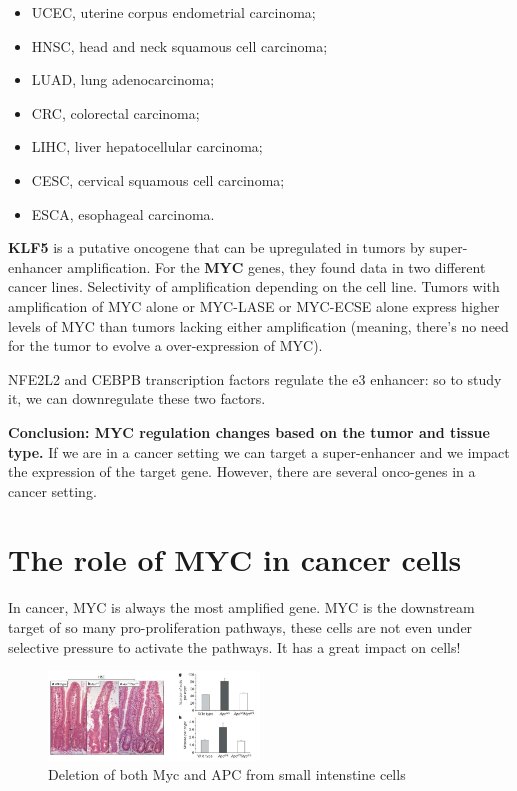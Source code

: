 \begin{itemize}
\item UCEC, uterine corpus endometrial carcinoma; 
\item HNSC, head and neck squamous cell carcinoma; 
\item LUAD, lung adenocarcinoma; 
\item CRC, colorectal carcinoma; 
\item LIHC, liver hepatocellular carcinoma; 
\item CESC, cervical squamous cell carcinoma; 
\item ESCA, esophageal carcinoma.
\end{itemize}

\textbf{KLF5} is a putative oncogene that can be upregulated in tumors by super-enhancer amplification.
For the \textbf{MYC} genes, they found data in two different cancer lines. Selectivity of amplification depending on the cell line.
Tumors with amplification of MYC alone or MYC-LASE or MYC-ECSE alone express higher levels of MYC than tumors lacking either amplification (meaning, there's no need for the tumor to evolve a over-expression of MYC).

NFE2L2 and CEBPB transcription factors regulate the e3 enhancer: so to study it, we can downregulate these two factors.

\textbf{Conclusion: MYC regulation changes based on the tumor and tissue type.}
If we are in a cancer setting we can target a super-enhancer and we impact the expression of the target gene. However, there are several onco-genes in a cancer setting.

\hypertarget{the-role-of-myc-in-cancer-cells}{%
\section{The role of MYC in cancer cells}\label{the-role-of-myc-in-cancer-cells}}

In cancer, MYC is always the most amplified gene. MYC is the downstream target of so many pro-proliferation pathways, these cells are not even under selective pressure to activate the pathways.
It has a great impact on cells!

\begin{figure}
\centering
\includegraphics[width=0.5\textwidth]{../_resources/641af477cb65d73954e1ae24aab9a2ed.png}
\caption{Deletion of both Myc and APC from small intenstine cells}
\label{fig:inhi}
\end{figure}

